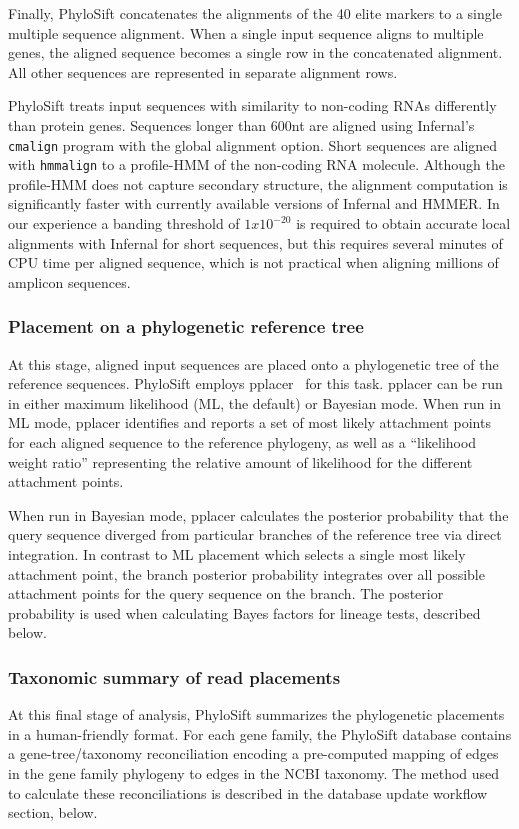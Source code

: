 \documentclass[10pt]{article}
\begin{document}
Finally, PhyloSift concatenates the alignments of the 40 elite markers to a single multiple sequence alignment.
When a single input sequence aligns to multiple genes, the aligned sequence becomes a single row in the concatenated alignment.
All other sequences are represented in separate alignment rows.

PhyloSift treats input sequences with similarity to non-coding {RNA}s differently than protein genes.
Sequences longer than 600nt are aligned using Infernal's \texttt{cmalign} program with the global alignment option.
Short sequences are aligned with \texttt{hmmalign} to a profile-HMM of the non-coding RNA molecule.
Although the profile-HMM does not capture secondary structure, the alignment computation is significantly faster with currently available versions of Infernal and HMMER.
In our experience a banding threshold of $1x10^{-20}$ is required to obtain accurate local alignments with Infernal for short sequences, but this requires several minutes of CPU time per aligned sequence, which is not practical when aligning millions of amplicon sequences.

\subsubsection*{Placement on a phylogenetic reference tree}

At this stage, aligned input sequences are placed onto a phylogenetic tree of the reference sequences.
PhyloSift employs pplacer~\cite{Matsen2010} for this task.
pplacer can be run in either maximum likelihood (ML, the default) or Bayesian mode.
When run in ML mode, pplacer identifies and reports a set of most likely attachment points for each aligned sequence to the reference phylogeny, as well as a ``likelihood weight ratio'' representing the relative amount of likelihood for the different attachment points.

When run in Bayesian mode, pplacer calculates the posterior probability that the query sequence diverged from particular branches of the reference tree via direct integration.
In contrast to ML placement which selects a single most likely attachment point, the branch posterior probability integrates over all possible attachment points for the query sequence on the branch.
The posterior probability is used when calculating Bayes factors for lineage tests, described below.

\subsubsection*{Taxonomic summary of read placements}
At this final stage of analysis, PhyloSift summarizes the phylogenetic placements in a human-friendly format.
For each gene family, the PhyloSift database contains a gene-tree/taxonomy reconciliation encoding a pre-computed mapping of edges in the gene family phylogeny to edges in the NCBI taxonomy. %
The method used to calculate these reconciliations is described in the database update workflow section, below.
\end{document}

